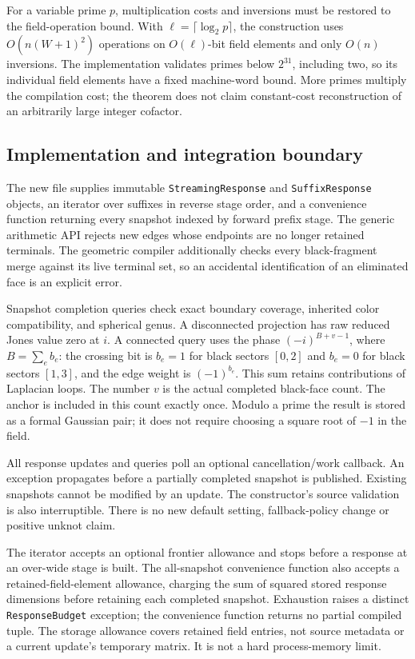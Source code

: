 For a variable prime $p$, multiplication costs and inversions must be
restored to the field-operation bound.  With $\ell=\lceil\log_2p\rceil$,
the construction uses $O(n(W+1)^2)$ operations on $O(\ell)$-bit field
elements and only $O(n)$ inversions.  The implementation validates
primes below $2^{31}$, including two, so its individual field elements
have a fixed machine-word bound.  More primes multiply the compilation
cost; the theorem does not claim constant-cost reconstruction of an
arbitrarily large integer cofactor.

\subsection{Implementation and integration boundary}

The new file  supplies immutable
\texttt{StreamingResponse} and \texttt{SuffixResponse} objects, an
iterator over suffixes in reverse stage order, and a convenience
function returning every snapshot indexed by forward prefix stage.
The generic arithmetic API rejects new edges whose endpoints are no
longer retained terminals.  The geometric compiler additionally checks
every black-fragment merge against its live terminal set, so an
accidental identification of an eliminated face is an explicit error.

Snapshot completion queries check exact boundary coverage, inherited
color compatibility, and spherical genus.  A disconnected projection
has raw reduced Jones value zero at $i$.  A connected query uses the
phase $(-i)^{B+v-1}$, where $B=\sum_e b_e$: the crossing bit is
$b_e=1$ for black sectors $[0,2]$ and $b_e=0$ for black sectors $[1,3]$,
and the edge weight is $(-1)^{b_e}$. This sum retains contributions of
Laplacian loops. The number $v$ is the actual completed black-face count.
The anchor is included in this count exactly once.  Modulo a prime the
result is stored as a formal Gaussian pair; it does not require
choosing a square root of $-1$ in the field.

All response updates and queries poll an optional cancellation/work
callback.  An exception propagates before a partially completed
snapshot is published.  Existing snapshots cannot be modified by an
update.  The constructor's source validation is also interruptible.
There is no new default setting, fallback-policy change or positive
unknot claim.

The iterator accepts an optional frontier allowance and stops before a
response at an over-wide stage is built.  The all-snapshot convenience
function also accepts a retained-field-element allowance, charging the
sum of squared stored response dimensions before retaining each completed
snapshot.  Exhaustion raises a distinct \texttt{ResponseBudget} exception;
the convenience function returns no partial compiled tuple.  The storage
allowance covers retained field entries, not source metadata or a current
update's temporary matrix.  It is not a hard process-memory limit.

